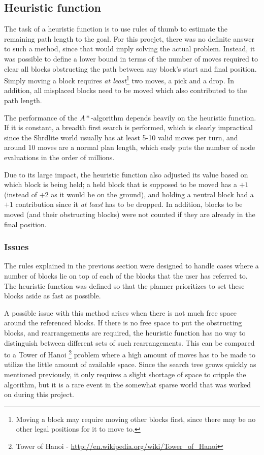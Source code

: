 \subsection{Heuristic function}

The task of a heuristic function is to use rules of thumb to estimate the
remaining path length to the goal. For this proejct, there was no definite
answer to such a method, since that would imply solving the actual problem.
Instead, it was possible to define a lower bound in terms of the number of moves
required to clear all blocks obstructing the path between any block's start and
final position. Simply moving a block requires \textit{at least}\footnote{Moving
a block may require moving other blocks first, since there may be no other legal
positions for it to move to.} two moves, a pick and a drop. In addition, all
misplaced blocks need to be moved which also contributed to the path length.  

The performance of the $A*$-algorithm depends heavily on the heuristic function.
If it is constant, a breadth first search is performed, which is clearly
impractical since the Shrdlite world usually has at least 5-10 valid moves per
turn, and around 10 moves are a normal plan length, which easly puts the number
of node evaluations in the order of millions. 

Due to its large impact, the heuristic function also adjusted its value based on
which block is being held; a held block that is supposed to be moved has a $+1$
(instead of $+2$ as it would be on the ground), and holding a neutral block had
a $+1$ contribution since it \textit{at least} has to be dropped. In addition,
blocks to be moved (and their obstructing blocks) were not counted if they are
already in the final position.

\subsubsection{Issues}

The rules explained in the previous section were designed to handle cases where
a number of blocks lie on top of each of the blocks that the user has referred
to. The heuristic function was defined so that the planner prioritizes to set
these blocks aside as fast as possible.

A possible issue with this method arises when there is not much free space
around the referenced blocks. If there is no free space to put the obstructing
blocks, and rearrangements are required, the heuristic function has no way to
distinguish between different sets of such rearrangements. This can be compared
to a Tower of Hanoi \footnote{Tower of Hanoi -
\url{http://en.wikipedia.org/wiki/Tower_of_Hanoi}} problem where a high amount of
moves has to be made to utilize the little amount of available space. Since the
search tree grows quickly as mentioned previously, it only requires a slight
shortage of space to cripple the algorithm, but it is a rare event in the
somewhat sparse world that was worked on during this project.

